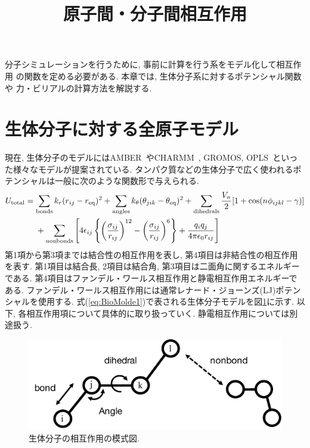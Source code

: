 




\graphicspath{{../figure/forcefield/}{../../figure/forcefield/}}

\title{原子間・分子間相互作用}
\maketitle

分子シミュレーションを行うために, 事前に計算を行う系をモデル化して相互作用
の関数を定める必要がある. 本章では, 生体分子系に対するポテンシャル関数や
力・ビリアルの計算方法を解説する.

\section{生体分子に対する全原子モデル}
現在, 生体分子のモデルにはAMBER~\cite{1995Cornell}やCHARMM~\cite{1983Brooks},
GROMOS, OPLS~\cite{1988Jorgensen}といった様々なモデルが提案されている.
タンパク質などの生体分子で広く使われるポテンシャルは一般に次のような関数形で与えられる. 
\begin{align}
    U_{\mathrm{total}}
 &=
    \sum_{\mathrm{bonds}} k_{r} (r_{ij} - r_{\mathrm{eq}})^{2}
   +\sum_{\mathrm{angles}} k_{\theta} (\theta_{jik} - \theta_{\mathrm{eq}})^{2}
   +\sum_{\mathrm{dihedrals}}
    \frac{V_{n}}{2} [1 + \cos(n\phi_{ijkl} - \gamma)]
 \notag
 \\
 &~~~~
   +\sum_{\mathrm{nonbonds}}
    \left[
           4\epsilon_{ij}
           \left\{
                   \left(\frac{\sigma_{ij}}{r_{ij}}\right)^{12}
                  -\left(\frac{\sigma_{ij}}{r_{ij}}\right)^{6}
           \right\}
          +\frac{q_{i} q_{j}}{4 \pi \epsilon_{0} r_{ij}}
 \right]
 \label{eq:BioMolde1}
\end{align}
第1項から第3項までは結合性の相互作用を表し, 第4項目は非結合性の相互作用を表す. 
第1項目は結合長, 2項目は結合角, 第3項目は二面角に関するエネルギーである. 
第4項目はファンデル・ワールス相互作用と静電相互作用エネルギーである. 
ファンデル・ワールス相互作用には通常レナード・ジョーンズ(LJ)ポテンシャルを使用する. 
式(\ref{eq:BioMolde1})で表される生体分子モデルを図\ref{Fig:BioModel}に示す. 
以下, 各相互作用項について具体的に取り扱っていく. 
静電相互作用については別途扱う.

 \begin{figure}
 \begin{center}
  \includegraphics[width=0.5\hsize]{fig_biomol_model.pdf}
  \caption{生体分子の相互作用の模式図.}
  \label{Fig:BioModel}
 \end{center}
\end{figure}

